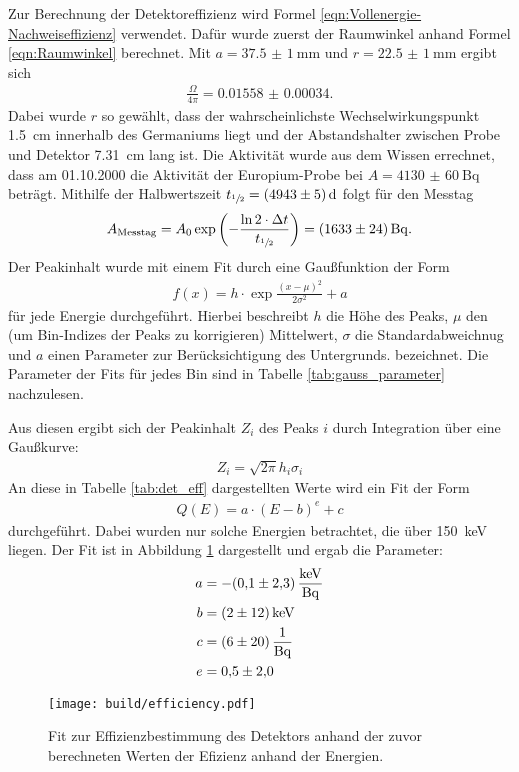 Zur Berechnung der Detektoreffizienz wird Formel
\eqref{eqn:Vollenergie-Nachweiseffizienz} verwendet. Dafür wurde zuerst der
Raumwinkel anhand Formel \eqref{eqn:Raumwinkel} berechnet. Mit
$a = \SI{37.5(10)}{\milli\meter}$ und $r = \SI{22.5(10)}{\milli\meter}$ ergibt sich
\begin{align*}
  \frac{\Omega}{4\pi} = \num{0.01558(34)}
	.
\end{align*}
Dabei wurde $r$ so gewählt, dass der wahrscheinlichste Wechselwirkungspunkt
\SI{1.5}{\centi\meter} innerhalb des Germaniums liegt und der Abstandshalter
zwischen Probe und Detektor \SI{7.31}{\centi\meter} lang ist.
Die Aktivität wurde aus dem Wissen errechnet, dass am 01.10.2000 die Aktivität
der Europium-Probe bei $A = \SI{4130(60)}{\becquerel}$ beträgt. Mithilfe der
Halbwertszeit $t_{\sfrac{1}{2}} = \SI{4943(5)}{\day}$ folgt für den Messtag
\begin{align*}
	A_\text{Messtag} = A_0 \exp\left(-\frac{\ln{2} \cdot\Delta t}{t_{\sfrac{1}{2}}}\right)=\SI{1633(24)}{\becquerel}
	.
\end{align*}
Der Peakinhalt wurde mit einem Fit durch eine Gaußfunktion der Form
\begin{align*}
	f\left(x\right) = h\cdot \exp{\frac{(x-\mu)^2}{2\sigma^2}} + a
\end{align*}
für jede Energie durchgeführt. Hierbei beschreibt $h$ die Höhe des Peaks, $\mu$
den (um Bin-Indizes der Peaks zu korrigieren) Mittelwert, $\sigma$ die
Standardabweichnug und $a$ einen Parameter zur Berücksichtigung des Untergrunds.
bezeichnet. Die Parameter der Fits für jedes Bin sind in Tabelle
\ref{tab:gauss_parameter} nachzulesen.

\FloatBarrier

Aus diesen ergibt sich der Peakinhalt $Z_i$ des Peaks $i$ durch Integration
über eine Gaußkurve:
\begin{align*}
  Z_i = \sqrt{2\pi} h_i \sigma_i
\end{align*}
An diese in Tabelle \ref{tab:det_eff} dargestellten Werte wird ein Fit der Form
\begin{align*}
  Q(E) = a \cdot (E - b)^e + c
\end{align*}
durchgeführt. Dabei wurden nur solche Energien betrachtet, die über
\SI{150}{\kilo\electronvolt} liegen.
Der Fit ist in Abbildung \ref{plt:eff} dargestellt und ergab die Parameter:
\begin{align*}
  a &= -\SI{0.1(23)}{\kilo\electronvolt\per\becquerel} \\
  b &= \SI{2(12)}{\kilo\electronvolt} \\
  c &= \SI{6(20)}{\raiseto{-1}\becquerel} \\
  e &= \num{0.5(20)}
\end{align*}
\begin{figure}[htb]
  \centering
  \texttt{[image: build/efficiency.pdf]}
  \caption{Fit zur Effizienzbestimmung des Detektors anhand der zuvor
  berechneten Werten der Efizienz anhand der Energien.}
  \label{plt:eff}
\end{figure}

